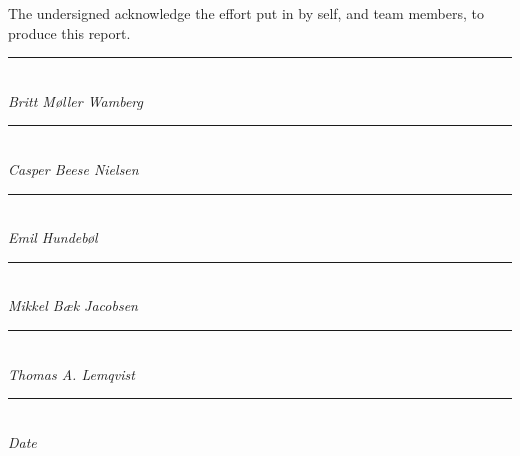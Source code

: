 {\color{red} The undersigned acknowledge the effort put in by self, and team members, to produce this report.}
\vfill
\begin{multicols}{2}
\begin{center}
	\rule{8cm}{1pt}
\textit{\\Britt Møller Wamberg\\}
\vspace{2cm}
	\rule{8cm}{1pt}
\textit{\\Casper Beese Nielsen\\}
\columnbreak
	\rule{8cm}{1pt}
\textit{\\Emil Hundebøl\\}
\vspace{2cm}
	\rule{8cm}{1pt}
\textit{\\Mikkel Bæk Jacobsen\\}
\end{center}
\end{multicols}
\begin{center}
\vspace{2cm}
	\rule{8cm}{1pt}
\textit{\\Thomas A. Lemqvist\\}
\vspace{2cm}
\rule{8cm}{1pt}
\textit{\\Date}
\end{center}
\vfill